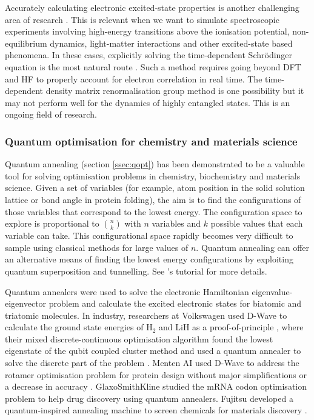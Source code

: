 \documentclass[10pt]{iopart}
\begin{document}
Accurately calculating electronic excited-state properties is another challenging area of research \cite{Westermayr2021}. This is relevant when we want to simulate spectroscopic experiments involving high-energy transitions above the ionisation potential, non-equilibrium dynamics, light-matter interactions and other excited-state based phenomena. In these cases, explicitly solving the time-dependent Schr{\"o}dinger equation is the most natural route \cite{Goings2018,Li2020c}. 
Such a method requires going beyond DFT and HF to properly account for electron correlation in real time. The time-dependent density matrix renormalisation group method \cite{Baiardi2021} is one possibility but it may not perform well for the dynamics of highly entangled states. This is an ongoing field of research.


\subsubsection{Quantum optimisation for chemistry and materials science}\hfill

Quantum annealing (section \ref{ssec:qopt}) has been demonstrated to be a valuable tool for solving optimisation problems in chemistry, biochemistry and materials science. Given a set of variables (for example, atom position in the solid solution lattice or bond angle in protein folding), the aim is to find the configurations of those variables that correspond to the lowest energy. The configuration space to explore is proportional to $\binom{n}{k}$ with $n$ variables and $k$ possible values that each variable can take. This configurational space rapidly becomes very difficult to sample using classical methods for large values of $n$. Quantum annealing can offer an alternative means of finding the lowest energy configurations by exploiting quantum superposition and tunnelling. See \citeauthor{Camino2023}'s \cite{Camino2023} tutorial for more details.

Quantum annealers were used to solve the electronic Hamiltonian eigenvalue-eigenvector problem \cite{Teplukhin2020} and calculate the excited electronic states \cite{Teplukhin2021} for biatomic and triatomic molecules. In industry, researchers at Volkswagen used D-Wave to calculate the ground state energies of H$_2$ and LiH as a proof-of-principle \cite{Streif2018}, where their mixed discrete-continuous optimisation algorithm found the lowest eigenstate of the qubit coupled cluster method and used a quantum annealer to solve the discrete part of the problem \cite{Genin2019}. Menten AI used D-Wave to address the rotamer optimisation problem for protein design without major simplifications or a decrease in accuracy \cite{Mulligan2019}. GlaxoSmithKline studied the mRNA codon optimisation problem to help drug discovery \cite{Fox2021} using quantum annealers. Fujitsu developed a quantum-inspired annealing machine to screen chemicals for materials discovery \cite{Hatakeyama-Sato}. 
\end{document}
